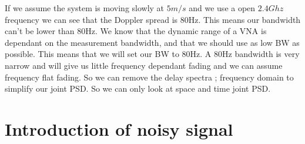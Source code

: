 If we assume the system is moving slowly at $5m/s$ and we use a open $2.4Ghz$ frequency we can see that the Doppler spread is 80Hz. This means our bandwidth can't be lower than 80Hz. We know that the dynamic range of a VNA is dependant on the measurement bandwidth, and that we should use as low BW as possible. This means that we will set our BW to 80Hz. A 80Hz bandwidth is very narrow and will give us little frequency dependant fading and we can assume frequency flat fading. So we can remove the delay spectra ; frequency domain to simplify our joint PSD. So we can only look at space and time joint PSD.

\section{Introduction of noisy signal}